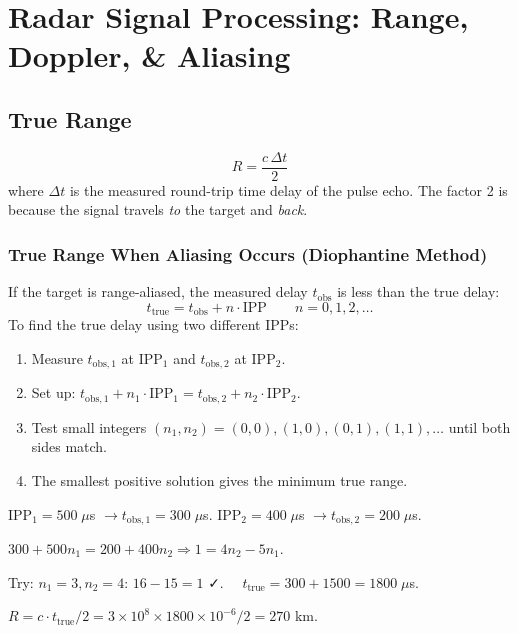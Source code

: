 \documentclass[10pt,letterpaper]{article}
\begin{document}
\section{Radar Signal Processing: Range, Doppler, \& Aliasing}

\subsection{True Range}

\begin{tcolorbox}[formulabox, title={True Range from Round-Trip Delay}]
\begin{equation}
  R = \frac{c\,\Delta t}{2}
\end{equation}
where $\Delta t$ is the measured round-trip time delay of the pulse echo. The factor 2 is because the signal travels \emph{to} the target and \emph{back}.
\end{tcolorbox}

\subsubsection{True Range When Aliasing Occurs (Diophantine Method)}
If the target is range-aliased, the measured delay $t_\mathrm{obs}$ is less than the true delay:
\begin{equation}
  t_\mathrm{true} = t_\mathrm{obs} + n\cdot\mathrm{IPP} \qquad n = 0, 1, 2, \ldots
\end{equation}
To find the true delay using two different IPPs:
\begin{enumerate}[noitemsep]
  \item Measure $t_\mathrm{obs,1}$ at IPP$_1$ and $t_\mathrm{obs,2}$ at IPP$_2$.
  \item Set up: $t_\mathrm{obs,1} + n_1\cdot\mathrm{IPP}_1 = t_\mathrm{obs,2} + n_2\cdot\mathrm{IPP}_2$.
  \item Test small integers $(n_1, n_2) = (0,0), (1,0), (0,1), (1,1), \ldots$ until both sides match.
  \item The smallest positive solution gives the minimum true range.
\end{enumerate}

\begin{tcolorbox}[examplebox, title={HW6 P3 Example: Range Aliasing}]
IPP$_1 = 500\;\mu$s $\to t_\mathrm{obs,1} = 300\;\mu$s. IPP$_2 = 400\;\mu$s $\to t_\mathrm{obs,2} = 200\;\mu$s.

$300 + 500n_1 = 200 + 400n_2 \Rightarrow 1 = 4n_2 - 5n_1$.

Try: $n_1=3, n_2=4$: $16-15=1$ ✓. $\quad t_\mathrm{true} = 300 + 1500 = 1800\;\mu$s.

$R = c\cdot t_\mathrm{true}/2 = 3\times10^8\times1800\times10^{-6}/2 = 270$ km.
\end{tcolorbox}
\end{document}
